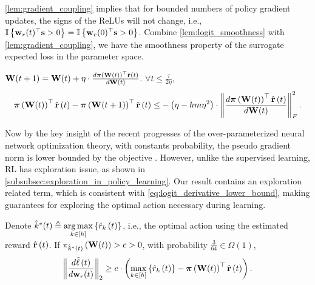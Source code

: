 \cref{lem:gradient_coupling} implies that for bounded numbers of policy gradient updates, the signs of the ReLUs will not change, i.e., ${\mathbb{I}}\left\{ {\mathbf{w}}_r(t)^\top {\mathbf{s}} > 0 \right\} = {\mathbb{I}}\left\{ {\mathbf{w}}_r(0)^\top {\mathbf{s}} > 0 \right\}$. Combine \cref{lem:logit_smoothness} with \cref{lem:gradient_coupling}, we have the smoothness property of the surrogate expected loss in the parameter space.
\begin{lem}
\label{lem:empirically_expected_reward_parameter_smoothness}
    ${\mathbf{W}}(t+1) = {\mathbf{W}}(t) + \eta \cdot \frac{d {\boldsymbol{\pi}}\left({\mathbf{W}}(t)\right)^\top \hat{{\mathbf{r}}}\left(t\right)}{d {\mathbf{W}}(t)}$. $\forall t \le \frac{\tau}{ 2 \eta }$,
\begin{equation}
\label{eq:parameter_smoothness}
\begin{split}
    {\boldsymbol{\pi}}\left( {\mathbf{W}}(t) \right)^\top \hat{{\mathbf{r}}}\left(t\right) - {\boldsymbol{\pi}}\left( {\mathbf{W}}(t+1) \right)^\top \hat{{\mathbf{r}}}\left(t\right) \le - \left( \eta - h m \eta^2 \right) \cdot \left\| \frac{d {\boldsymbol{\pi}}\left( {\mathbf{W}}(t) \right)^\top \hat{{\mathbf{r}}}\left(t\right)}{d {\mathbf{W}}(t)} \right\|_F^2.
\end{split}
\end{equation}
\end{lem}

Now by the key insight of the recent progresses of the over-parameterized neural network optimization theory, with constants probability, the pseudo gradient norm is lower bounded by the objective \citep{li2018learning}. However, unlike the supervised learning, RL has exploration issue, as shown in \cref{subsubsec:exploration_in_policy_learning}. Our result contains an exploration related term, which is consistent with \cref{eq:logit_derivative_lower_bound}, making guarantees for exploring the optimal action necessary during learning.

\begin{lem}
\label{lem:gradient_lower_bound}
	Denote $\hat{k}^*(t) \triangleq \operatorname*{arg\,max}\limits_{k \in [h]}\left\{ \hat{r}_{k}\left(t\right) \right\}$, i.e., the optimal action using the estimated reward $ \hat{{\mathbf{r}}}\left(t\right)$. If $\pi_{\hat{k}^*(t)}\left({\mathbf{W}}(t)\right) > c > 0$, with probability $\frac{3}{64} \in \Omega\left( 1 \right)$,
\begin{equation*}
\begin{split}
	\left\| \frac{d\tilde{\ell}\left(t\right)}{d {\mathbf{w}}_r(t)} \right\|_2 \ge c \cdot \left( \max\limits_{k \in \left[h\right]}\left\{ \hat{r}_k\left(t\right) \right\} - {\boldsymbol{\pi}}\left( {\mathbf{W}}(t) \right)^\top \hat{{\mathbf{r}}}\left(t\right) \right) .
\end{split}
\end{equation*}
\end{lem}

